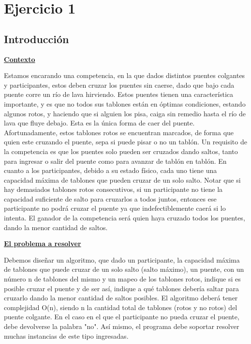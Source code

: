 \section{Ejercicio 1}

\subsection{Introducción}
\noindent \underline{\textbf{Contexto}}

Estamos encarando una competencia, en la que dados distintos puentes colgantes y participantes, estos deben cruzar los puentes sin caerse, dado que bajo cada puente corre un río de lava hirviendo.
Estos puentes tienen una característica importante, y es que no todos sus tablones están en óptimas condiciones, estando algunos rotos, y haciendo que si alguien los pisa, caiga sin remedio hasta el río de lava que fluye debajo. Esta es la única forma de caer del puente. Afortunadamente, estos tablones rotos se encuentran marcados, de forma que quien este cruzando el puente, sepa si puede pisar o no un tablón.
Un requisito de la competencia es que los puentes solo pueden ser cruzados dando saltos, tanto para ingresar o salir del puente como para avanzar de tablón en tablón.
En cuanto a los participantes, debido a su estado físico, cada uno tiene una capacidad máxima de tablones que pueden cruzar de un solo salto.
Notar que si hay demasiados tablones rotos consecutivos, si un participante no tiene la capacidad suficiente de salto para cruzarlos a todos juntos, entonces ese participante no podrá cruzar el puente ya que indefectiblemente caerá si lo intenta.
El ganador de la competencia será quien haya cruzado todos los puentes, dando la menor cantidad de saltos.

\noindent \underline{\textbf{El problema a resolver}}

Debemos diseñar un algoritmo, que dado un participante, la capacidad máxima de tablones que puede cruzar de un solo salto (salto máximo), un puente, con un número n de tablones del mismo y un mapeo de los tablones rotos, indique si es posible cruzar el puente y de ser así, indique a qué tablones debería saltar para cruzarlo dando la menor cantidad de saltos posibles. El algoritmo deberá tener complejidad O(n), siendo n la cantidad total de tablones (rotos y no rotos) del puente colgante.
En el caso en el que el participante no pueda cruzar el puente, debe devolverse la palabra "no".
Así mismo, el programa debe soportar resolver muchas instancias de este tipo ingresadas.

